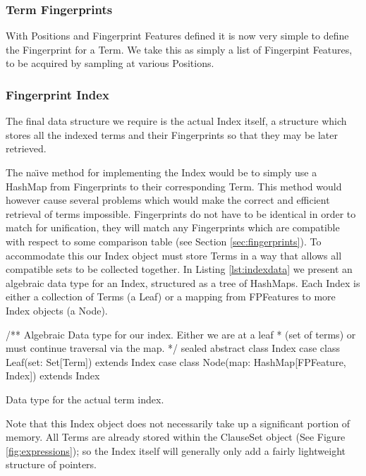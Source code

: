 \subsubsection{Term Fingerprints}

With Positions and Fingerprint Features defined it is now very simple
to define the Fingerprint for a Term. We take this as simply a list
of Fingerpint Features, to be acquired by sampling at various Positions. 

\subsubsection{Fingerprint Index}

The final data structure we require is the actual Index itself, a structure
which stores all the indexed terms and their Fingerprints so that they may be later
retrieved.

The na\"{\i}ve method for implementing the Index would be to simply use a HashMap
from Fingerprints to their corresponding Term. This method would however cause
several problems which would make the correct and efficient retrieval of terms impossible.
Fingerprints do not have to be identical in order to match for unification, they will match any
Fingerprints which are compatible with respect to some comparison table (see Section \ref{sec:fingerprints}).
To accommodate this our Index object must store Terms in a way that allows all compatible sets to be
collected together. In Listing \ref{lst:indexdata} we present an algebraic data
type for an Index, structured as a tree of HashMaps. Each Index is either a
collection of Terms (a Leaf) or a mapping from FPFeatures to more Index objects (a Node).

\begin{listing}[H]
\begin{scalacode}
/** Algebraic Data type for our index. Either we are at a leaf
  * (set of terms) or must continue traversal via the map. */ 
sealed abstract class Index
case class Leaf(set: Set[Term])                 extends Index
case class Node(map: HashMap[FPFeature, Index]) extends Index
\end{scalacode}
\caption{Data type for the actual term index. \protect\cite[p7]{shulz12}}
\label{lst:indexdata}
\end{listing}

Note that this Index object does not necessarily take up a significant portion of memory.
All Terms are already stored within the ClauseSet object (See Figure \ref{fig:expressions});
so the Index itself will generally only add a fairly lightweight structure of pointers.


